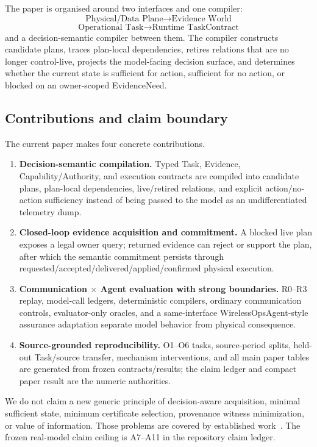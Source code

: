 \documentclass[journal,10pt]{IEEEtran}
\begin{document}
The paper is organised around two interfaces and one compiler:
\begin{equation}
\boxed{\text{Physical/Data Plane}\rightarrow\text{Evidence World}}
\label{eq:method-evidence}
\end{equation}
\begin{equation}
\boxed{\text{Operational Task}\rightarrow\text{Runtime TaskContract}}
\label{eq:method-runtime}
\end{equation}
and a decision-semantic compiler between them. The compiler constructs candidate plans, traces
plan-local dependencies, retires relations that are no longer control-live, projects the
model-facing decision surface, and determines whether the current state is sufficient for action,
sufficient for no action, or blocked on an owner-scoped EvidenceNeed.

\subsection{Contributions and claim boundary}
The current paper makes four concrete contributions.
\begin{enumerate}
\item \textbf{Decision-semantic compilation.} Typed Task, Evidence, Capability/Authority, and
execution contracts are compiled into candidate plans, plan-local dependencies, live/retired
relations, and explicit action/no-action sufficiency instead of being passed to the model as an
undifferentiated telemetry dump.
\item \textbf{Closed-loop evidence acquisition and commitment.} A blocked live plan exposes a
legal owner query; returned evidence can reject or support the plan, after which the semantic
commitment persists through requested/accepted/delivered/applied/confirmed physical execution.
\item \textbf{Communication $\times$ Agent evaluation with strong boundaries.} R0--R3 replay,
model-call ledgers, deterministic compilers, ordinary communication controls, evaluator-only
oracles, and a same-interface WirelessOpsAgent-style assurance adaptation separate model behavior
from physical consequence.
\item \textbf{Source-grounded reproducibility.} O1--O6 tasks, source-period splits, held-out
Task/source transfer, mechanism interventions, and all main paper tables are generated from frozen
contracts/results; the claim ledger and compact paper result are the numeric authorities.
\end{enumerate}
We do not claim a new generic principle of decision-aware acquisition, minimal sufficient state,
minimum certificate selection, provenance witness minimization, or value of information. Those
problems are covered by established work~\cite{javdani2014drd,huang2022asr,deshpande2013sbfe,hellerstein2022adaptivity,green2007provenance,lin2026blip}.
The frozen real-model claim ceiling is A7--A11 in the repository claim ledger.
\end{document}
